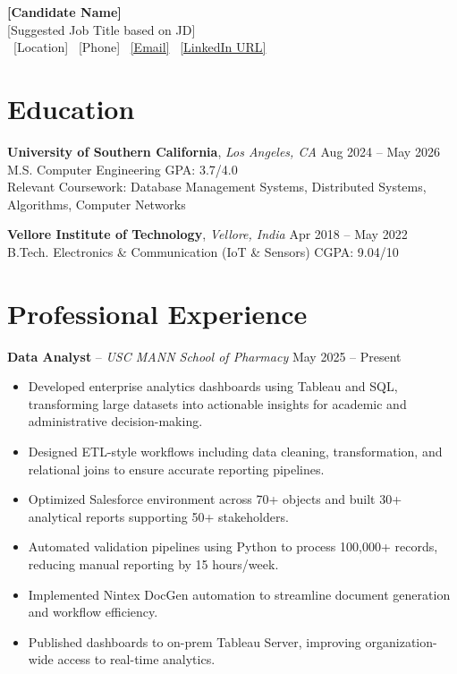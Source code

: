 \documentclass[letterpaper,11pt]{article}
\begin{document}
\begin{center}
    {\LARGE \textbf{[Candidate Name]}}\\
    {\normalsize [Suggested Job Title based on JD]} \\
    \small
    \faMapMarker*\ [Location]
    \quad
    \faPhone*\ [Phone]
    \quad
    \faEnvelope\ \href{mailto:[Email]}{[Email]}
    \quad
    \faLinkedin\ \href{[LinkedIn URL]}{[LinkedIn URL]}
\end{center}
\vspace{-13pt}

\section*{Education}

\textbf{University of Southern California}, \textit{Los Angeles, CA} \hfill Aug 2024 -- May 2026 \\
M.S. Computer Engineering \hfill GPA: 3.7/4.0 \\
Relevant Coursework: Database Management Systems, Distributed Systems, Algorithms, Computer Networks

\vspace{4pt}

\textbf{Vellore Institute of Technology}, \textit{Vellore, India }\hfill Apr 2018 -- May 2022 \\
B.Tech. Electronics \& Communication (IoT \& Sensors) \hfill CGPA: 9.04/10

\section*{Professional Experience}

\textbf{Data Analyst} – \textit{USC MANN School of Pharmacy} \hfill May 2025 -- Present
\begin{itemize}
\item Developed enterprise analytics dashboards using Tableau and SQL, transforming large datasets into actionable insights for academic and administrative decision-making.
\item Designed ETL-style workflows including data cleaning, transformation, and relational joins to ensure accurate reporting pipelines.
\item Optimized Salesforce environment across 70+ objects and built 30+ analytical reports supporting 50+ stakeholders.
\item Automated validation pipelines using Python to process 100,000+ records, reducing manual reporting by 15 hours/week.
\item Implemented Nintex DocGen automation to streamline document generation and workflow efficiency.
\item Published dashboards to on-prem Tableau Server, improving organization-wide access to real-time analytics.
\end{itemize}
\end{document}
